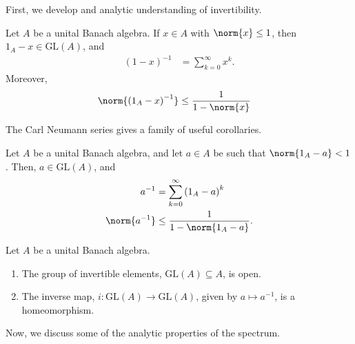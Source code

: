 First, we develop and analytic understanding of invertibility.
\begin{proposition}
  Let $A$ be a unital Banach algebra. If $x\in A$ with $\norm{x}\leq 1$, then $1_A - x\in \text{GL}\left( A \right)$, and
  \begin{align*}
    \left( 1-x \right)^{-1} &= \sum_{k=0}^{\infty}x^k.
  \end{align*}
  Moreover,
  \begin{align*}
    \norm{\left( 1_A - x \right)^{-1}} &\leq \frac{1}{1-\norm{x}}
  \end{align*}
\end{proposition}
The Carl Neumann series gives a family of useful corollaries.
\begin{corollary}
  Let $A$ be a unital Banach algebra, and let $a\in A$ be such that $\norm{1_A - a} < 1$. Then, $a\in \text{GL}\left( A \right)$, and
  \begin{align*}
    a^{-1} &= \sum_{k=0}^{\infty}\left( 1_A - a \right)^{k}\\
    \norm{a^{-1}} &\leq \frac{1}{1-\norm{1_A - a}}.
  \end{align*}
\end{corollary}
\begin{proposition}
  Let $A$ be a unital Banach algebra.
  \begin{enumerate}[(1)]
    \item The group of invertible elements, $\text{GL}\left( A \right)\subseteq A$, is open.
    \item The inverse map, $i\colon \text{GL}\left( A \right)\rightarrow \text{GL}\left( A \right)$, given by $a\mapsto a^{-1}$, is a homeomorphism.
  \end{enumerate}
\end{proposition}
Now, we discuss some of the analytic properties of the spectrum.
